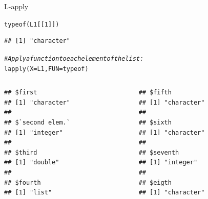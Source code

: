 \documentclass[xcolor=table,           xcolor=dvipsnames]{beamer}\usepackage[]{graphicx}\usepackage[]{color}
\makeatletter
\newcommand{\hlnum}[1]{\textcolor[rgb]{0,0,0}{#1}}
\newcommand{\hlcom}[1]{\textcolor[rgb]{0,0.392,0}{\textit{#1}}}
\newcommand{\hlstd}[1]{\textcolor[rgb]{0,0,0}{#1}}
\newcommand{\hlkwc}[1]{\textcolor[rgb]{1,0,1}{#1}}
\newcommand{\hlkwd}[1]{\textcolor[rgb]{0,0,1}{#1}}
\newenvironment{kframe}{%
 \def\at@end@of@kframe{}%
 \ifinner\ifhmode%
  \def\at@end@of@kframe{\end{minipage}}%
  \begin{minipage}{\columnwidth}%
 \fi\fi%
 \def\FrameCommand##1{\hskip\@totalleftmargin \hskip-\fboxsep
 \colorbox{shadecolor}{##1}\hskip-\fboxsep
     \hskip-\linewidth \hskip-\@totalleftmargin \hskip\columnwidth}%
 \MakeFramed {\advance\hsize-\width
   \@totalleftmargin\z@ \linewidth\hsize
   \@setminipage}}%
 {\par\unskip\endMakeFramed%
 \at@end@of@kframe}
\newenvironment{knitrout}{}{} %
\makeatother
\begin{document}
\begin{frame}[fragile]{L-apply}
\vspace{-1.5em}
\begin{knitrout}
\color{fgcolor}\begin{kframe}
\begin{alltt}
\hlkwd{typeof}\hlstd{(L1[[}\hlnum{1}\hlstd{]])}
\end{alltt}
\begin{verbatim}
## [1] "character"
\end{verbatim}
\end{kframe}
\end{knitrout}
\vspace{-1.5em}
\pause
\begin{knitrout}
\color{fgcolor}\begin{kframe}
\begin{alltt}
\hlcom{# Apply a function to each element of the list:}
\hlkwd{lapply}\hlstd{(}\hlkwc{X}\hlstd{=L1,} \hlkwc{FUN}\hlstd{=typeof)}
\end{alltt}
\end{kframe}
\end{knitrout}
\pause
\vspace{-2em}
\begin{columns}
\hspace{-5em}
\begin{column}{.4\textwidth}
\begin{knitrout}
\color{fgcolor}\begin{kframe}
\begin{verbatim}
## $first
## [1] "character"
## 
## $`second elem.`
## [1] "integer"
## 
## $third
## [1] "double"
## 
## $fourth
## [1] "list"
\end{verbatim}
\end{kframe}
\end{knitrout}
\end{column}
\hspace{-7em}
\begin{column}{.4\textwidth}
\begin{knitrout}
\color{fgcolor}\begin{kframe}
\begin{verbatim}
## $fifth
## [1] "character"
## 
## $sixth
## [1] "character"
## 
## $seventh
## [1] "integer"
## 
## $eigth
## [1] "character"
\end{verbatim}
\end{kframe}
\end{knitrout}
\end{column}
\end{columns}
\end{frame}
\end{document}
